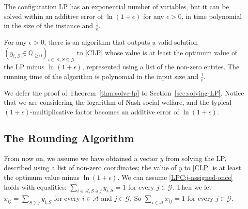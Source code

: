 \documentclass{theoretics}
\newcommand\calA{{\mathcal{A}}}
\newcommand\calG{{\mathcal{G}}}
\newcommand{\Q}{{\mathbb{Q}}}
\begin{document}
The configuration LP has an exponential number of variables, but it can be solved within an additive error of $\ln(1 + \epsilon)$ for any $\epsilon > 0$, in time polynomial in the size of the instance  and $\frac1\epsilon$. 
\begin{theorem}
    \label{thm:solve-lp}
    For any $\epsilon > 0$, there is an algorithm that     
    outputs a valid solution $(y_{i, S} \in \Q_{\geq 0})_{i \in \calA, S \subseteq \calG}$ to \eqref{CLP} whose value is at least the optimum value of the LP minus $\ln(1+\epsilon)$, represented using a list of the non-zero entries. The running time of the algorithm is polynomial in the input size and $\frac1\epsilon$.
\end{theorem}
We defer the proof of Theorem~\ref{thm:solve-lp} to Section~\ref{sec:solving-LP}. 
Notice that we are considering the logarithm of Nash social welfare, and the typical $(1+\epsilon)$-multiplicative factor becomes an additive error of $\ln(1 + \epsilon)$. 


\subsection{The Rounding Algorithm} \label{sec:rounding}
    From now on, we assume we have obtained a vector $y$ from solving the LP, described using a list of non-zero coordinates; the value of $y$ to \eqref{CLP} is at least the optimum value minus $\ln(1+\epsilon)$. We can assume \eqref{LPC:j-assigned-once} holds with equalities: $\sum_{i \in \calA, S \ni j}y_{i, S} = 1$ for every $j \in \calG$. Then we let $x_{ij} = \sum_{S \ni j} y_{i, S}$ for every $i \in \calA$ and $j \in \calG$. So $\sum_{i \in \calA} x_{ij} = 1$ for every $j \in \calG$.
\end{document}
